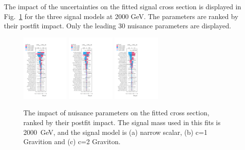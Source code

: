 The impact of the uncertainties on the fitted signal cross section is displayed in Fig.~\ref{fig:ranking2000} for the three signal models at 2000 GeV. The parameters are ranked by their postfit impact. Only the leading 30 nuisance parameters are displayed.

\begin{figure}[htbp!]
\begin{center}
\includegraphics[width=0.21\textwidth]{figures/boosted/results/ranking_okt18_s_2000.pdf} 
\includegraphics[width=0.21\textwidth]{figures/boosted/results/ranking_okt18_g10_2000.pdf} 
\includegraphics[width=0.21\textwidth]{figures/boosted/results/ranking_okt18_g20_2000.pdf} 
\caption{The impact of nuisance parameters on the fitted cross section, ranked by their postfit impact. The signal mass used in this fits is 2000~GeV, and the signal model is (a) narrow scalar, (b) c=1 Gravition and (c) c=2 Graviton.}
\label{fig:ranking2000}
\end{center}
\end{figure}
